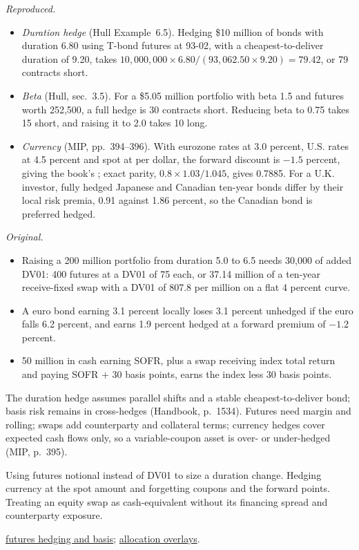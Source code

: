 \begin{qfmethod}
 \emph{Reproduced.}
\begin{itemize}
\item \emph{Duration hedge} (Hull Example~6.5). Hedging \$10 million of bonds with duration 6.80 using T-bond futures at 93-02, with a cheapest-to-deliver duration of 9.20, takes $10{,}000{,}000\times6.80/(93{,}062.50\times9.20)=79.42$, or 79 contracts short.
\item \emph{Beta} (Hull, sec.~3.5). For a \$5.05 million portfolio with beta 1.5 and futures worth 252{,}500, a full hedge is 30 contracts short. Reducing beta to 0.75 takes 15 short, and raising it to 2.0 takes 10 long.
\item \emph{Currency} (MIP, pp.~394--396). With eurozone rates at 3.0 percent, U.S. rates at 4.5 percent and spot at  per dollar, the forward discount is $-1.5$ percent, giving the book's ; exact parity, $0.8\times1.03/1.045$, gives 0.7885. For a U.K. investor, fully hedged Japanese and Canadian ten-year bonds differ by their local risk premia, 0.91 against 1.86 percent, so the Canadian bond is preferred hedged.
\end{itemize}

\emph{Original.}
\begin{itemize}
\item Raising a 200 million portfolio from duration 5.0 to 6.5 needs 30{,}000 of added DV01: 400 futures at a DV01 of 75 each, or 37.14 million of a ten-year receive-fixed swap with a DV01 of 807.8 per million on a flat 4 percent curve.
\item A euro bond earning 3.1 percent locally loses 3.1 percent unhedged if the euro falls 6.2 percent, and earns 1.9 percent hedged at a forward premium of $-1.2$ percent.
\item 50 million in cash earning SOFR, plus a swap receiving index total return and paying SOFR $+$ 30 basis points, earns the index less 30 basis points.
\end{itemize}

 The duration hedge assumes parallel shifts and a stable cheapest-to-deliver bond; basis risk remains in cross-hedges (Handbook, p.~1534). Futures need margin and rolling; swaps add counterparty and collateral terms; currency hedges cover expected cash flows only, so a variable-coupon asset is over- or under-hedged (MIP, p.~395).

 Using futures notional instead of DV01 to size a duration change. Hedging currency at the spot amount and forgetting coupons and the forward points. Treating an equity swap as cash-equivalent without its financing spread and counterparty exposure.

 \hyperref[def:futures-hedge-basis]{futures hedging and basis}; \hyperref[meth:derivative-overlay-allocation]{allocation overlays}.

\end{qfmethod}

